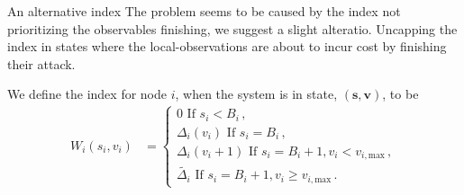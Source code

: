 \documentclass[10pt]{beamer}
\begin{document}
\begin{frame}{An alternative index}
The problem seems to be caused by the index not prioritizing the observables finishing, we suggest a slight alteratio. Uncapping the index in states where the local-observations are about to incur cost by finishing their attack.
\begin{definition}
We define the index for node $i$, when the system is in state, $(\bm{s},\bm{v})$, to be
\begin{align*}
W_{i}(s_{i},v_{i})&=\begin{cases}
0 \text{ If } s_{i}<B_{i} \, , \\
\Delta_{i}(v_{i}) \text{ If } s_{i}=B_{i} \, , \\
\Delta_{i}(v_{i}+1) \text{ If } s_{i}=B_{i}+1, v_{i} < v_{i,\text{max}} \, , \\
\widetilde{\Delta_{i}} \text{ If } s_{i}=B_{i}+1, v_{i} \geq v_{i,\text{max}} \, .
\end{cases}
\end{align*}
\end{definition}
\end{frame}



%       
%  
%
%  
%       
%       
%       
%        
%
%
%
%
%
%   
%
\end{document}
